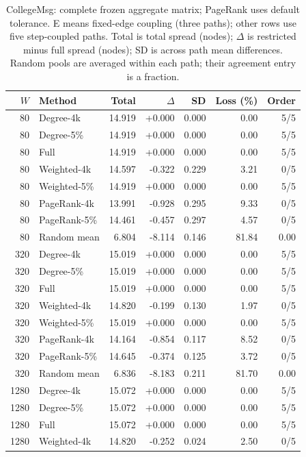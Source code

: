 \begin{table}[htbp]
\caption{CollegeMsg: complete frozen aggregate matrix; PageRank uses default tolerance. E means fixed-edge coupling (three paths); other rows use five step-coupled paths. Total is total spread (nodes); $\Delta$ is restricted minus full spread (nodes); SD is across path mean differences. Random pools are averaged within each path; their agreement entry is a fraction.}\label{tab:s-college_msg}
\begin{tabular}{rlrrrrr}
\toprule
$W$ & Method & Total & $\Delta$ & SD & Loss (\%) & Order \\
\midrule
80 & Degree-4k & 14.919 & +0.000 & 0.000 & 0.00 & 5/5 \\
80 & Degree-5\% & 14.919 & +0.000 & 0.000 & 0.00 & 5/5 \\
80 & Full & 14.919 & +0.000 & 0.000 & 0.00 & 5/5 \\
80 & Weighted-4k & 14.597 & -0.322 & 0.229 & 3.21 & 0/5 \\
80 & Weighted-5\% & 14.919 & +0.000 & 0.000 & 0.00 & 5/5 \\
80 & PageRank-4k & 13.991 & -0.928 & 0.295 & 9.33 & 0/5 \\
80 & PageRank-5\% & 14.461 & -0.457 & 0.297 & 4.57 & 0/5 \\
80 & Random mean & 6.804 & -8.114 & 0.146 & 81.84 & 0.00 \\
320 & Degree-4k & 15.019 & +0.000 & 0.000 & 0.00 & 5/5 \\
320 & Degree-5\% & 15.019 & +0.000 & 0.000 & 0.00 & 5/5 \\
320 & Full & 15.019 & +0.000 & 0.000 & 0.00 & 5/5 \\
320 & Weighted-4k & 14.820 & -0.199 & 0.130 & 1.97 & 0/5 \\
320 & Weighted-5\% & 15.019 & +0.000 & 0.000 & 0.00 & 5/5 \\
320 & PageRank-4k & 14.164 & -0.854 & 0.117 & 8.52 & 0/5 \\
320 & PageRank-5\% & 14.645 & -0.374 & 0.125 & 3.72 & 0/5 \\
320 & Random mean & 6.836 & -8.183 & 0.211 & 81.70 & 0.00 \\
1280 & Degree-4k & 15.072 & +0.000 & 0.000 & 0.00 & 5/5 \\
1280 & Degree-5\% & 15.072 & +0.000 & 0.000 & 0.00 & 5/5 \\
1280 & Full & 15.072 & +0.000 & 0.000 & 0.00 & 5/5 \\
1280 & Weighted-4k & 14.820 & -0.252 & 0.024 & 2.50 & 0/5 \\

\end{tabular}
\end{table}
